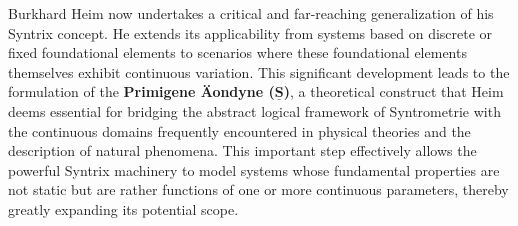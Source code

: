\documentclass[12pt]{article}
\begin{document}
Burkhard Heim now undertakes a critical and far-reaching generalization of his Syntrix concept. He extends its applicability from systems based on discrete or fixed foundational elements to scenarios where these foundational elements themselves exhibit continuous variation. This significant development leads to the formulation of the \textbf{Primigene \"{A}ondyne (\(\underline{\bm{S}}\))}, a theoretical construct that Heim deems essential for bridging the abstract logical framework of Syntrometrie with the continuous domains frequently encountered in physical theories and the description of natural phenomena. This important step effectively allows the powerful Syntrix machinery to model systems whose fundamental properties are not static but are rather functions of one or more continuous parameters, thereby greatly expanding its potential scope.
\end{document}
